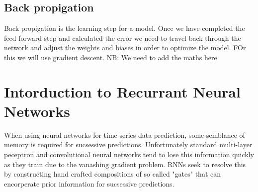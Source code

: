 \documentclass{article}
\begin{document}
\subsection{Back propigation}
\label{sec:back}
Back propigation is the learning step for a model. Once we have completed the feed forward step and calculated the error we need to travel back through the network and adjust the weights and biases in order to optimize the model. FOr this we will use gradient descent.
NB: We need to add the maths here 

\section{Intorduction to Recurrant Neural Networks}
\label{sec:intoRNNs}
When using neural networks for time series data prediction, some semblance of memory is required for sucsessive predictions. Unfortunately standard multi-layer peceptron and convolutional neural networks tend to lose this information quickly as they train due to the vanashing gradient problem. RNNs seek to resolve this by constructing hand crafted compositions of so called "gates" that can encorperate prior information for sucsessive predictions. 
\end{document}
